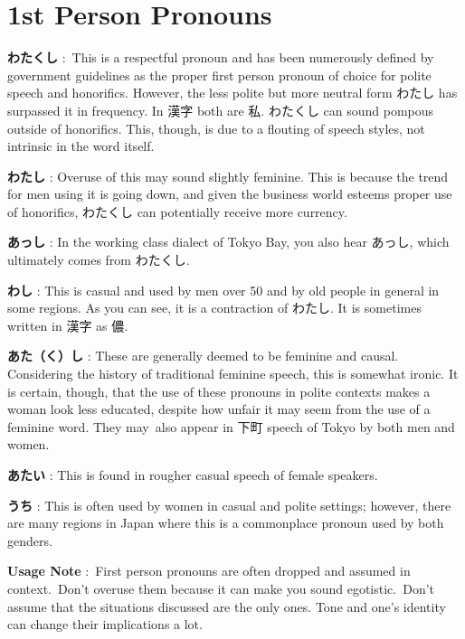 \section{1st Person Pronouns}
 
\par{\textbf{わたくし }: This is a respectful pronoun and has been numerously defined by government guidelines as the proper first person pronoun of choice for polite speech and honorifics. However, the less polite but more neutral form わたし has surpassed it in frequency. In 漢字 both are 私. わたくし can sound pompous outside of honorifics. This, though, is due to a flouting of speech styles, not intrinsic in the word itself. }

\par{\textbf{わたし }: Overuse of this may sound slightly feminine. This is because the trend for men using it is going down, and given the business world esteems proper use of honorifics, わたくし can potentially receive more currency. }

\par{\textbf{あっし }: In the working class dialect of Tokyo Bay, you also hear あっし, which ultimately comes from わたくし. }

\par{\textbf{わし }: This is casual and used by men over 50 and by old people in general in some regions. As you can see, it is a contraction of わたし. It is sometimes written in 漢字 as 儂. }

\par{\textbf{あた（く）し }: These are generally deemed to be feminine and causal. Considering the history of traditional feminine speech, this is somewhat ironic. It is certain, though, that the use of these pronouns in polite contexts makes a woman look less educated, despite how unfair it may seem from the use of a feminine word. They may also appear in 下町 speech of Tokyo by both men and women. }

\par{\textbf{あたい }: This is found in rougher casual speech of female speakers. }

\par{\textbf{うち }: This is often used by women in casual and polite settings; however, there are many regions in Japan where this is a commonplace pronoun used by both genders. }

\par{\textbf{Usage Note }: First person pronouns are often dropped and assumed in context. Don't overuse them because it can make you sound egotistic. Don't assume that the situations discussed are the only ones. Tone and one's identity can change their implications a lot. }

